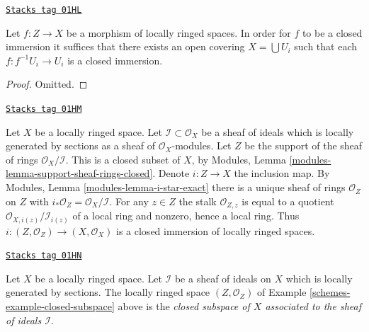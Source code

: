 \begin{lemma}
\label{schemes-lemma-closed-local-target}
\href{https://stacks.math.columbia.edu/tag/01HL}{\texttt{Stacks tag 01HL}}

Let $f : Z \to X$ be a morphism of locally ringed spaces.
In order for $f$ to be a closed immersion it suffices
that there exists an open covering $X = \bigcup U_i$ such
that each $f : f^{-1}U_i \to U_i$ is a closed immersion.
\end{lemma}

\begin{proof}
Omitted.
\end{proof}

\begin{example}
\label{schemes-example-closed-subspace}
\href{https://stacks.math.columbia.edu/tag/01HM}{\texttt{Stacks tag 01HM}}

Let $X$ be a locally ringed space.
Let $\mathcal{I} \subset \mathcal{O}_X$ be a sheaf
of ideals which is locally generated by sections as a sheaf
of $\mathcal{O}_X$-modules. Let $Z$ be the support of
the sheaf of rings $\mathcal{O}_X/\mathcal{I}$.
This is a closed subset of $X$, by
Modules, Lemma \ref{modules-lemma-support-sheaf-rings-closed}.
Denote $i : Z \to X$ the inclusion map.
By Modules, Lemma \ref{modules-lemma-i-star-exact}
there is a unique sheaf of rings $\mathcal{O}_Z$ on $Z$
with $i_*\mathcal{O}_Z = \mathcal{O}_X/\mathcal{I}$.
For any $z \in Z$ the stalk $\mathcal{O}_{Z, z}$
is equal to a quotient $\mathcal{O}_{X, i(z)}/\mathcal{I}_{i(z)}$
of a local ring and nonzero, hence a local ring.
Thus $i : (Z, \mathcal{O}_Z) \to (X, \mathcal{O}_X)$ is
a closed immersion of locally ringed spaces.
\end{example}

\begin{definition}
\label{schemes-definition-closed-subspace}
\href{https://stacks.math.columbia.edu/tag/01HN}{\texttt{Stacks tag 01HN}}

Let $X$ be a locally ringed space.
Let $\mathcal{I}$ be a sheaf of ideals on $X$
which is locally generated by sections.
The locally ringed space $(Z, \mathcal{O}_Z)$
of Example \ref{schemes-example-closed-subspace} above
is the {\it closed subspace of $X$ associated to
the sheaf of ideals $\mathcal{I}$}.
\end{definition}

